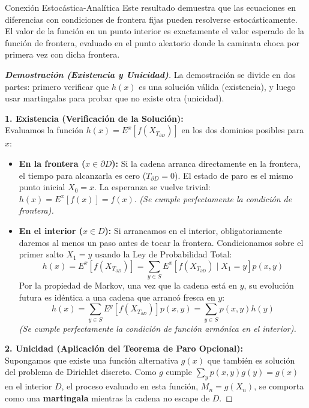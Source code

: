 \documentclass[10pt,a4paper]{article}
\begin{document}
\begin{nota}{Conexión Estocástica-Analítica}
    Este resultado demuestra que las ecuaciones en diferencias con condiciones de frontera fijas pueden resolverse estocásticamente. El valor de la función en un punto interior es exactamente el valor esperado de la función de frontera, evaluado en el punto aleatorio donde la caminata choca por primera vez con dicha frontera.
\end{nota}

\vspace{5mm}

\begin{proof}[\textbf{Demostración (Existencia y Unicidad)}]
    La demostración se divide en dos partes: primero verificar que $h(x)$ es una solución válida (existencia), y luego usar martingalas para probar que no existe otra (unicidad).
    
    \textbf{1. Existencia (Verificación de la Solución):} \\
    Evaluamos la función $h(x) = E^x[f(X_{T_{\partial D}})]$ en los dos dominios posibles para $x$:
    \begin{itemize}
        \item \textbf{En la frontera ($x \in \partial D$):} Si la cadena arranca directamente en la frontera, el tiempo para alcanzarla es cero ($T_{\partial D} = 0$). El estado de paro es el mismo punto inicial $X_0 = x$. 
        La esperanza se vuelve trivial: $h(x) = E^x[f(x)] = f(x)$. 
        \textit{(Se cumple perfectamente la condición de frontera).}
        
        \item \textbf{En el interior ($x \in D$):} Si arrancamos en el interior, obligatoriamente daremos al menos un paso antes de tocar la frontera. Condicionamos sobre el primer salto $X_1 = y$ usando la Ley de Probabilidad Total:
        \[ h(x) = E^x[f(X_{T_{\partial D}})] = \sum_{y \in S} E^x[f(X_{T_{\partial D}}) \mid X_1 = y] p(x,y) \]
        Por la propiedad de Markov, una vez que la cadena está en $y$, su evolución futura es idéntica a una cadena que arrancó fresca en $y$:
        \[ h(x) = \sum_{y \in S} E^y[f(X_{T_{\partial D}})] p(x,y) = \sum_{y \in S} p(x,y) h(y) \]
        \textit{(Se cumple perfectamente la condición de función armónica en el interior).}
    \end{itemize}

    \textbf{2. Unicidad (Aplicación del Teorema de Paro Opcional):} \\
    Supongamos que existe una función alternativa $g(x)$ que también es solución del problema de Dirichlet discreto. 
    Como $g$ cumple $\sum_y p(x,y) g(y) = g(x)$ en el interior $D$, el proceso evaluado en esta función, $M_n = g(X_n)$, se comporta como una \textbf{martingala} mientras la cadena no escape de $D$.
    

\end{proof}
\end{document}
